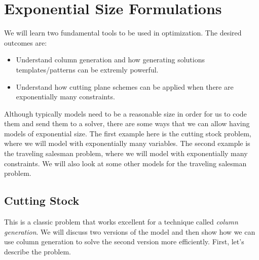 
%
%

\chapter{Exponential Size Formulations}
\label{sec:exponential-IP-forumulations}
\begin{outcome}
We will learn two fundamental tools to be used in optimization.  The desired outcomes are:
\begin{itemize}
\item Understand column generation and how generating solutions templates/patterns can be extremly powerful.
\item Understand how cutting plane schemes can be applied when there are exponentially many constraints.
\end{itemize}

\end{outcome}

Although typically models need to be a reasonable size in order for us to code them and send them to a solver, there are some ways that we can allow having models of exponential size.  The first example here is the cutting stock problem, where we will model with exponentially many variables.  The second example is the traveling salesman problem, where we will model with exponentially many constraints.  We will also look at some other models for the traveling salesman problem.  
\section{Cutting Stock}
This is a classic problem that works excellent for a technique called \emph{column generation}.
We will discuss two versions of the model and then show how we can use column generation to solve the second version more efficiently.  First, let's describe the problem.

